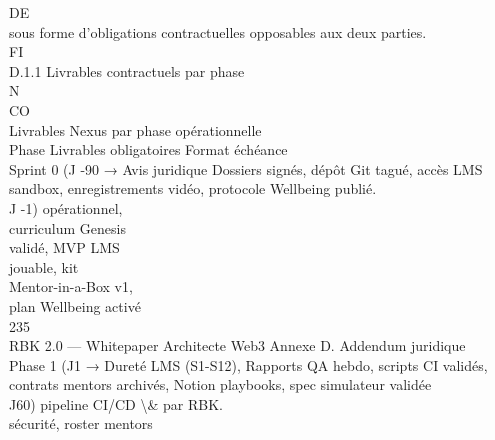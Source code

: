 \documentclass[12pt,landscape,a4paper]{article}
\begin{document}
DE\\
sous forme d’obligations contractuelles opposables aux deux parties.\\
\vspace{0.5em}
\vspace{0.5em}
\vspace{0.5em}
\vspace{0.5em}
FI\\
D.1.1 Livrables contractuels par phase\\
\vspace{0.5em}
\vspace{0.5em}
N\\
CO\\
Livrables Nexus par phase opérationnelle\\
\vspace{0.5em}
\vspace{0.5em}
\vspace{0.5em}
Phase                 Livrables obligatoires    Format échéance\\
Sprint 0 (J -90 →     Avis juridique            Dossiers signés, dépôt Git tagué, accès LMS sandbox, enregistrements vidéo, protocole Wellbeing publié.\\
J -1)                 opérationnel,\\
curriculum Genesis\\
validé, MVP LMS\\
jouable, kit\\
Mentor-in-a-Box v1,\\
plan Wellbeing activé\\
\vspace{0.5em}
\vspace{0.5em}
\vspace{0.5em}
\vspace{0.5em}
235\\
RBK 2.0 — Whitepaper Architecte Web3                                                                                             Annexe D. Addendum juridique\\
\vspace{0.5em}
\vspace{0.5em}
\vspace{0.5em}
Phase 1 (J1 →         Dureté LMS (S1-S12),       Rapports QA hebdo, scripts CI validés, contrats mentors archivés, Notion playbooks, spec simulateur validée\\
J60)                  pipeline CI/CD \textbackslash{}&           par RBK.\\
sécurité, roster mentors\\
\end{document}
